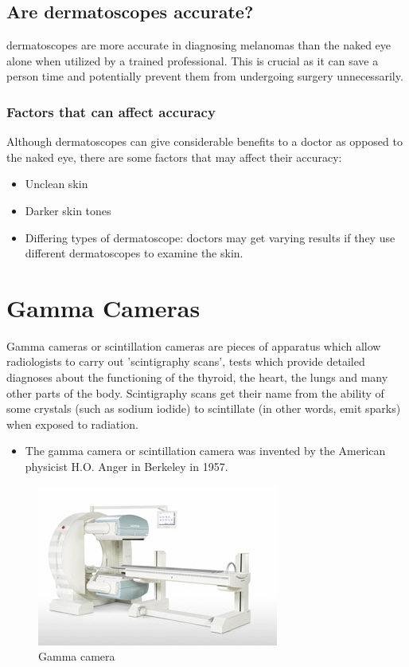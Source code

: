 \documentclass{article}
\begin{document}
\subsection{Are dermatoscopes accurate?}
dermatoscopes are more accurate in diagnosing melanomas than the naked eye alone when utilized by a trained professional. This is crucial as it can save a person time and potentially prevent them from undergoing surgery unnecessarily.
\subsubsection{Factors that can affect accuracy}
Although dermatoscopes can give considerable benefits to a doctor as opposed to the naked eye, there are some factors that may affect their accuracy:
\begin{itemize}
\item Unclean skin
\item Darker skin tones
\item Differing types of dermatoscope: doctors may get varying results if they use different dermatoscopes to examine the skin.
\end{itemize}
\pagebreak
\section{Gamma Cameras}
Gamma cameras or scintillation cameras are pieces of apparatus which allow radiologists to carry out 'scintigraphy scans', tests which provide detailed diagnoses about the functioning of the thyroid, the heart, the lungs and many other parts of the body. Scintigraphy scans get their name from the ability of some crystals (such as sodium iodide) to scintillate (in other words, emit sparks) when exposed to radiation.

\begin{itemize}
\item The gamma camera or scintillation camera was invented by the American physicist H.O. Anger in Berkeley in 1957.
\end{itemize}
\begin{figure} [h]
    \centering
    \includegraphics{siemens_300.jpg}
    \caption{Gamma camera}
    \label{fig:gamma camera}
\end{figure}
\end{document}
